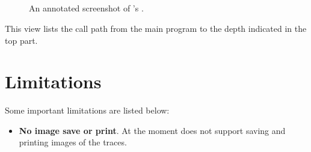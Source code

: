 \subsection{\callview}
\label{sec:callview}

\begin{figure}[t]
\caption{An annotated screenshot of \hpctraceviewer{}'s \callview.}
\label{fig:hpctraceviewer-callpath-legend}
\end{figure}

This view lists the call path from the main program to the depth indicated in the top part.





\section{Limitations}

Some important \hpctraceviewer{} limitations are listed below:
\begin{itemize}

\item \textbf{No image save or print}.
	At the moment \hpctraceviewer{} does not support saving and printing images of the traces.


\end{itemize}

